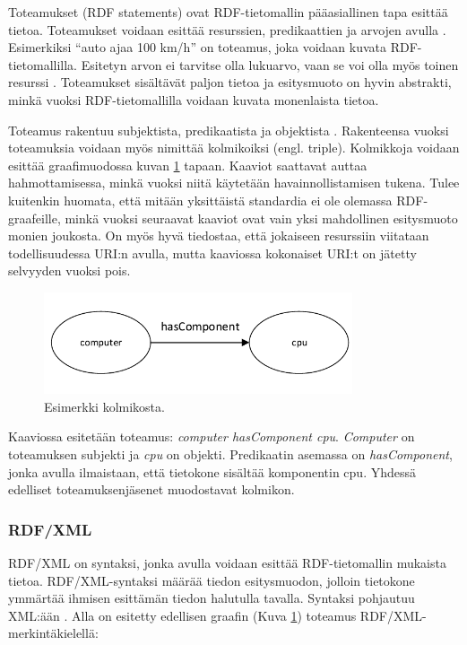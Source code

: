 \documentclass[finnish, 12pt, a4paper, elec, utf8, pdfa, online]{aaltothesis}
\begin{document}
Toteamukset (RDF statements) ovat RDF-tietomallin pääasiallinen tapa esittää tietoa. Toteamukset voidaan esittää resurssien, predikaattien ja arvojen avulla \cite{Antoniou}. Esimerkiksi ``auto ajaa 100 km/h'' on toteamus, joka voidaan kuvata RDF-tietomallilla. Esitetyn arvon ei tarvitse olla lukuarvo, vaan se voi olla myös toinen resurssi \cite{Antoniou}\cite{IEEE_XML}. Toteamukset sisältävät paljon tietoa ja esitysmuoto on hyvin abstrakti, minkä vuoksi RDF-tietomallilla voidaan kuvata monenlaista tietoa.

Toteamus rakentuu subjektista, predikaatista ja objektista \cite{lassila_dissertion}. Rakenteensa vuoksi toteamuksia voidaan myös nimittää kolmikoiksi (engl. triple). Kolmikkoja voidaan esittää graafimuodossa kuvan \ref{images/RDF-triplet1} tapaan. Kaaviot saattavat auttaa hahmottamisessa, minkä vuoksi niitä käytetään havainnollistamisen tukena. Tulee kuitenkin huomata, että mitään yksittäistä standardia ei ole olemassa RDF-graafeille, minkä vuoksi seuraavat kaaviot ovat vain yksi mahdollinen esitysmuoto monien joukosta. On myös hyvä tiedostaa, että jokaiseen resurssiin viitataan todellisuudessa URI:n avulla, mutta kaaviossa kokonaiset URI:t on jätetty selvyyden vuoksi pois.

\begin{figure}[htb]
\centering
\includegraphics[height=3cm]{images/RDF-triplet.pdf}
\caption{Esimerkki kolmikosta. \label{images/RDF-triplet1}}
\end{figure}

Kaaviossa esitetään toteamus: \textit{computer hasComponent cpu}. \textit{Computer} on toteamuksen subjekti ja \textit{cpu} on objekti. Predikaatin asemassa on \textit{hasComponent}, jonka avulla ilmaistaan, että tietokone sisältää komponentin cpu. Yhdessä edelliset toteamuksenjäsenet muodostavat kolmikon.



\subsubsection{RDF/XML}
RDF/XML on syntaksi, jonka avulla voidaan esittää RDF-tietomallin mukaista tietoa. RDF/XML-syntaksi määrää tiedon esitysmuodon, jolloin tietokone ymmärtää ihmisen esittämän tiedon halutulla tavalla. Syntaksi pohjautuu XML:ään \cite{RDF_XML}. Alla on esitetty edellisen graafin (Kuva \ref{images/RDF-triplet1}) toteamus RDF/XML-merkintäkielellä:
\end{document}
